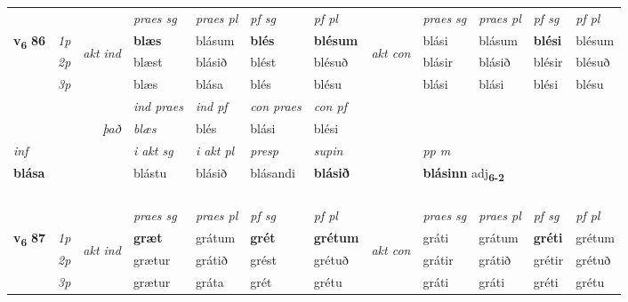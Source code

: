 \begin{longtable}[l]{X>{\footnotesize\itshape}llXXXXlXXXX}
 & &   & \textit{praes sg}  & \textit{praes pl}    & \textit{ pf sg} & \textit{pf pl} & & \textit{praes sg}  & \textit{praes pl}    & \textit{pf sg} & \textit{pf pl }  \\ \cmidrule{4-7} \cmidrule{9-12}
 \multirow{2}{*}{{{\textbf{v{\textsubscript{6}}} \Large{\textbf{86}}}}}  & 1p & \multirow{3}{*}{\begin{turn}{90}\textit{akt ind}\end{turn}} & \textbf{blæs} & blásum & \textbf{blés} & \textbf{blésum} & \multirow{3}{*}{\begin{turn}{90}\textit{akt con}\end{turn}} &blási & blásum & \textbf{blési} & blésum\\*
 & 2p &  &  blæst  & blásið & blést & blésuð & & blásir & blásið & blésir & blésuð \\*
 & 3p &  & blæs & blása & blés & blésu & & blási & blási& blési & blésu \\*
\cmidrule{4-7} \cmidrule{9-12}

   && &  \textit{ind praes} & \textit{ind pf} & \textit{con praes} & \textit{con pf} \\*
\multicolumn{3}{r}{\textit{það}} & blæs & blés & blási & blési \\*

\cmidrule{4-7}
   {\textit{inf}} & &  & \textit{i akt sg} & \textit{i akt pl}   & \textit{presp} & \textit{supin}  && \textit{pp m} \\*
  {\textbf{blása}} & && blástu  & blásið   & blásandi &  \textbf{blásið}  && \multicolumn{2}{l}{\textbf{blásinn} adj\textbf{\textsubscript{6-2}}} \\*

\midrule
  & \\*
    & \\*
   & \\*
  & \\
   \midrule
 & &   & \textit{praes sg}  & \textit{praes pl}    & \textit{ pf sg} & \textit{pf pl} & & \textit{praes sg}  & \textit{praes pl}    & \textit{pf sg} & \textit{pf pl }  \\ \cmidrule{4-7} \cmidrule{9-12}
 \multirow{2}{*}{{{\textbf{v{\textsubscript{6}}} \Large{\textbf{87}}}}}  & 1p & \multirow{3}{*}{\begin{turn}{90}\textit{akt ind}\end{turn}} & \textbf{græt} & grátum & \textbf{grét} & \textbf{grétum} & \multirow{3}{*}{\begin{turn}{90}\textit{akt con}\end{turn}} &gráti & grátum & \textbf{gréti} & grétum\\*
 & 2p &  &  grætur  & grátið & grést & grétuð & & grátir & grátið & grétir & grétuð \\*
 & 3p &  & grætur & gráta & grét & grétu & & gráti & gráti& gréti & grétu \\*
\cmidrule{4-7} \cmidrule{9-12}


\end{longtable}
